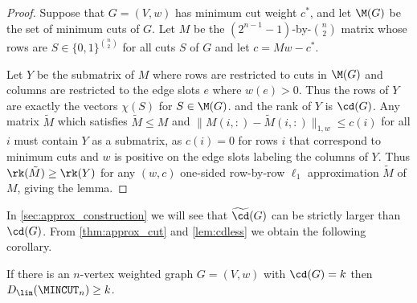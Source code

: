 \begin{proof}
Suppose that $G = (V,w)$ has minimum cut weight $c^*$, and let $\M(G)$ be the set of minimum cuts of $G$.
Let $M$ be the $(2^{n-1}-1)$-by-$\binom{n}{2}$ matrix whose rows are $S \in \{0,1\}^{\binom{n}{2}}$ for all cuts $S$ of $G$
and let $c = Mw-c^*$.

Let $Y$ be the submatrix of $M$ where rows are restricted to cuts in $\M(G)$ and columns are restricted
to the edge slots $e$ where $w(e) > 0$.  Thus the rows of $Y$ are exactly the vectors $\chi(S)$ for $S \in \M(G)$.
and the rank of $Y$ is $\cd(G)$.  Any matrix $\tilde M$ which satisfies $\tilde M \le M$ and $\|M(i,:)-\tilde{M}(i,:)\|_{1,w} \le c(i)$
for all $i$ must contain $Y$ as a submatrix, as $c(i)=0$ for rows $i$ that correspond to minimum cuts and $w$ is positive on the
edge slots labeling the columns of $Y$.  Thus $\rk(\tilde M) \ge \rk(Y)$ for any $(w,c)$ one-sided row-by-row $\ell_1$ approximation
$\tilde M$ of $M$, giving the lemma.
\end{proof}

In \cref{sec:approx_construction} we will see that $\widetilde{\cd}(G)$ can be strictly larger than $\cd(G)$.  From \cref{thm:approx_cut} and
\cref{lem:cdless} we obtain the following corollary.
\begin{corollary}
\label{cor:cd_linear}
If there is an $n$-vertex weighted graph $G = (V,w)$ with $\cd(G) = k$
then $D_\lin(\MINCUT_n) \ge k$.
\end{corollary}

